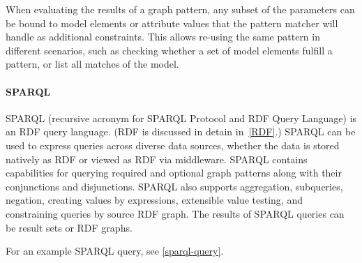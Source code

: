 When evaluating the results of a graph pattern, any subset of the parameters
can be bound to model elements or attribute values that the pattern matcher
will handle as additional constraints. This allows re-using the same pattern
in different scenarios, such as checking whether a set of model elements
fulfill a pattern, or list all matches of the model.

\paragraph{SPARQL}
\label{sect:sparql}
SPARQL (recursive acronym for SPARQL Protocol and RDF Query Language) is an RDF query language. (RDF is discussed in detain in~\ref{RDF}.) SPARQL can be used to express queries across diverse data sources, whether the data is stored natively as RDF or viewed as RDF via middleware. SPARQL contains capabilities for querying required and optional graph patterns along with their conjunctions and disjunctions. SPARQL also supports aggregation, subqueries, negation, creating values by expressions, extensible value testing, and constraining queries by source RDF graph. The results of SPARQL queries can be result sets or RDF graphs.~\cite{W3C-SPARQL,Harris:13:SQL}

For an example SPARQL query, see \ref{sparql-query}.
